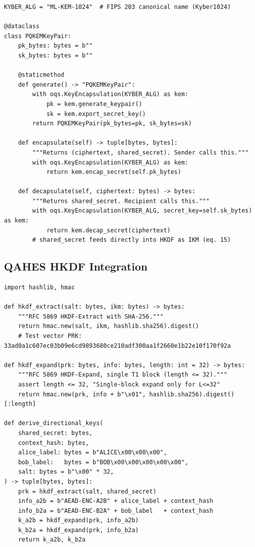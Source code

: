 \documentclass[12pt,letterpaper]{article}
\theoremstyle{plain}
\theoremstyle{definition}
\begin{document}
\begin{lstlisting}[caption={PQKEMKeyPair using ML-KEM-1024 (FIPS 203)}]
KYBER_ALG = "ML-KEM-1024"  # FIPS 203 canonical name (Kyber1024)

@dataclass
class PQKEMKeyPair:
    pk_bytes: bytes = b""
    sk_bytes: bytes = b""

    @staticmethod
    def generate() -> "PQKEMKeyPair":
        with oqs.KeyEncapsulation(KYBER_ALG) as kem:
            pk = kem.generate_keypair()
            sk = kem.export_secret_key()
        return PQKEMKeyPair(pk_bytes=pk, sk_bytes=sk)

    def encapsulate(self) -> tuple[bytes, bytes]:
        """Returns (ciphertext, shared_secret). Sender calls this."""
        with oqs.KeyEncapsulation(KYBER_ALG) as kem:
            return kem.encap_secret(self.pk_bytes)

    def decapsulate(self, ciphertext: bytes) -> bytes:
        """Returns shared_secret. Recipient calls this."""
        with oqs.KeyEncapsulation(KYBER_ALG, secret_key=self.sk_bytes) as kem:
            return kem.decap_secret(ciphertext)
        # shared_secret feeds directly into HKDF as IKM (eq. 15)
\end{lstlisting}

\subsection{QAHES HKDF Integration}

\begin{lstlisting}[caption={HKDF key derivation following QAHES v1.0.1 (RFC 5869)}]
import hashlib, hmac

def hkdf_extract(salt: bytes, ikm: bytes) -> bytes:
    """RFC 5869 HKDF-Extract with SHA-256."""
    return hmac.new(salt, ikm, hashlib.sha256).digest()
    # Test vector PRK: 33ad0a1c607ec03b09e6cd9893680ce210adf300aa1f2660e1b22e10f170f92a

def hkdf_expand(prk: bytes, info: bytes, length: int = 32) -> bytes:
    """RFC 5869 HKDF-Expand, single T1 block (length <= 32)."""
    assert length <= 32, "Single-block expand only for L<=32"
    return hmac.new(prk, info + b"\x01", hashlib.sha256).digest()[:length]

def derive_directional_keys(
    shared_secret: bytes,
    context_hash: bytes,
    alice_label: bytes = b"ALICE\x00\x00\x00",
    bob_label:   bytes = b"BOB\x00\x00\x00\x00\x00",
    salt: bytes = b"\x00" * 32,
) -> tuple[bytes, bytes]:
    prk = hkdf_extract(salt, shared_secret)
    info_a2b = b"AEAD-ENC-A2B" + alice_label + context_hash
    info_b2a = b"AEAD-ENC-B2A" + bob_label   + context_hash
    k_a2b = hkdf_expand(prk, info_a2b)
    k_b2a = hkdf_expand(prk, info_b2a)
    return k_a2b, k_b2a
\end{lstlisting}
\end{document}
